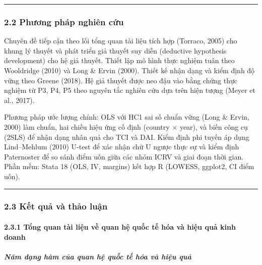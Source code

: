 \documentclass[
  a4paper,
  13pt]{extreport}
\begin{document}
\begin{center}\rule{0.5\linewidth}{0.5pt}\end{center}

\hypertarget{phux1b0ux1a1ng-phuxe1p-nghiuxean-cux1ee9u}{%
\subsubsection{2.2 Phương pháp nghiên
cứu}\label{phux1b0ux1a1ng-phuxe1p-nghiuxean-cux1ee9u}}

Chuyên đề tiếp cận theo lối tổng quan tài liệu tích hợp (Torraco, 2005)
cho khung lý thuyết và phát triển giả thuyết suy diễn (deductive
hypothesis development) cho hệ giả thuyết. Thiết lập mô hình thực nghiệm
tuân theo Wooldridge (2010) và Long \& Ervin (2000). Thiết kế nhận dạng
và kiểm định độ vững theo Greene (2018). Hệ giả thuyết được neo đậu vào
bằng chứng thực nghiệm từ P3, P4, P5 theo nguyên tắc nghiên cứu dựa trên
hiện tượng (Meyer et al., 2017).

Phương pháp ước lượng chính: OLS với HC1 sai số chuẩn vững (Long \&
Ervin, 2000) làm chuẩn, hai chiều hiệu ứng cố định (country × year), và
biến công cụ (2SLS) để nhận dạng nhân quả cho TCI và DAI. Kiểm định phi
tuyến áp dụng Lind--Mehlum (2010) U-test để xác nhận chữ U ngược thực sự
và kiểm định Paternoster để so sánh điểm uốn giữa các nhóm ICRV và giai
đoạn thời gian. Phần mềm: Stata 18 (OLS, IV, margins) kết hợp R (LOWESS,
ggplot2, CI điểm uốn).

\begin{center}\rule{0.5\linewidth}{0.5pt}\end{center}

\hypertarget{kux1ebft-quux1ea3-vuxe0-thux1ea3o-luux1eadn}{%
\subsubsection{2.3 Kết quả và thảo
luận}\label{kux1ebft-quux1ea3-vuxe0-thux1ea3o-luux1eadn}}

\hypertarget{tux1ed5ng-quan-tuxe0i-liux1ec7u-vux1ec1-quan-hux1ec7-quux1ed1c-tux1ebf-huxf3a-vuxe0-hiux1ec7u-quux1ea3-kinh-doanh}{%
\paragraph{2.3.1 Tổng quan tài liệu về quan hệ quốc tế hóa và hiệu quả
kinh
doanh}\label{tux1ed5ng-quan-tuxe0i-liux1ec7u-vux1ec1-quan-hux1ec7-quux1ed1c-tux1ebf-huxf3a-vuxe0-hiux1ec7u-quux1ea3-kinh-doanh}}

\hypertarget{nux103m-dux1ea1ng-huxe0m-cux1ee7a-quan-hux1ec7-quux1ed1c-tux1ebf-huxf3a-vuxe0-hiux1ec7u-quux1ea3}{%
\subparagraph{Năm dạng hàm của quan hệ quốc tế hóa và hiệu
quả}\label{nux103m-dux1ea1ng-huxe0m-cux1ee7a-quan-hux1ec7-quux1ed1c-tux1ebf-huxf3a-vuxe0-hiux1ec7u-quux1ea3}}
\end{document}
